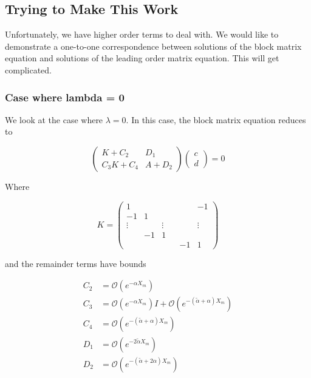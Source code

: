 \documentclass[12pt]{article}
\begin{document}
\subsection{Trying to Make This Work}

Unfortunately, we have higher order terms to deal with. We would like to demonstrate a one-to-one correspondence between solutions of the block matrix equation and solutions of the leading order matrix equation. This will get complicated.

\subsubsection{Case where lambda = 0}

We look at the case where $\lambda = 0$. In this case, the block matrix equation reduces to

\begin{equation}\label{lambdazero}
\begin{pmatrix}
K + C_2 & D_1 \\
C_3 K + C_4 & A + D_2
\end{pmatrix}
\begin{pmatrix}c \\ d \end{pmatrix} 
= 0
\end{equation}

Where

\begin{equation}\label{defK}
K = 
\begin{pmatrix}
1 & & & & & -1 \\
-1 & 1 \\
\vdots & & \vdots & &&  \vdots \\
& -1 & 1 \\
& & & & -1 & 1
\end{pmatrix}
\end{equation}

and the remainder terms have bounds

\begin{align*}
C_2 &= \mathcal{O}(e^{-\alpha X_m}) \\
C_3 &= \mathcal{O}(e^{-\alpha X_m}) I
+ \mathcal{O} (e^{-(\tilde{\alpha} + \alpha) X_m}) \\
C_4 &= \mathcal{O}(e^{-(\tilde{\alpha} + \alpha) X_m}) \\
D_1 &= \mathcal{O}(e^{-2 \tilde{\alpha} X_m}) \\
D_2 &= \mathcal{O}(e^{-(\tilde{\alpha} + 2 \alpha) X_m})
\end{align*}
\end{document}
